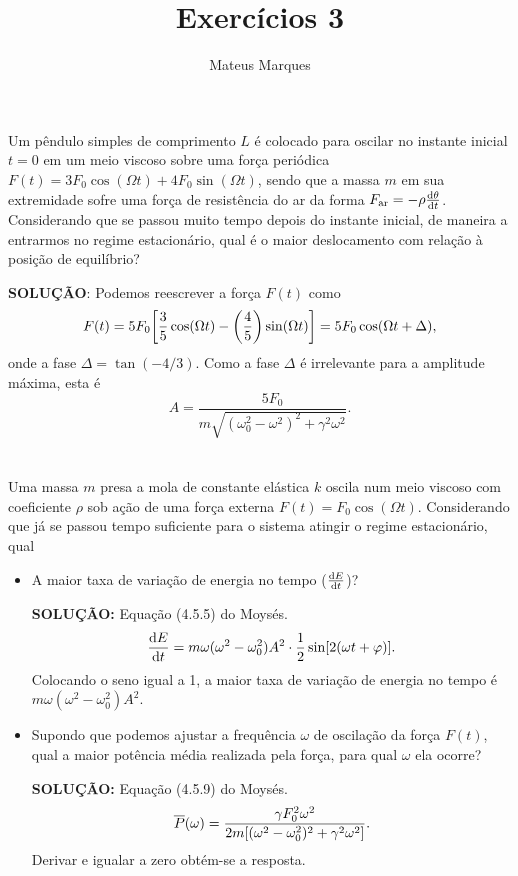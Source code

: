 \documentclass[a4paper,10pt]{article}
\title{\Huge{\textbf{Exercícios 3}}}
\author{Mateus Marques}
\begin{document}
\maketitle

\section{}

Um pêndulo simples de comprimento $L$ é colocado para oscilar no instante inicial $t = 0$ em um meio viscoso sobre uma força periódica $F(t) = 3 F_0 \cos(\Omega t) + 4 F_0 \sin(\Omega t)$, sendo que a massa $m$ em sua extremidade sofre uma força de resistência do ar da forma $F_{\text{ar}} = - \rho \dv{\theta}{t}$. Considerando que se passou muito tempo depois do instante inicial, de maneira a entrarmos no regime estacionário, qual é o maior deslocamento com relação à posição de equilíbrio?

\n

\textbf{SOLUÇÃO}: Podemos reescrever a força $F(t)$ como
$$
F(t) = 5 F_0 \qty[\frac{3}{5} \cos(\Omega t) - \qty(\frac{4}{5}) \sin(\Omega t)] = 5 F_0 \cos(\Omega t + \Delta),
$$
onde a fase $\Delta = \tan(-4/3)$. Como a fase $\Delta$ é irrelevante para a amplitude máxima, esta é
$$
A = \frac{5 F_0}{m \sqrt{(\omega_0^2 - \omega^2)^2 + \gamma^2 \omega^2}}.
$$


\n



\section{}


Uma massa $m$ presa a mola de constante elástica $k$ oscila num meio viscoso com coeficiente $\rho$ sob ação de uma força externa $F(t) = F_0 \cos(\Omega t)$. Considerando que já se passou tempo suficiente para o sistema atingir o regime estacionário, qual
\begin{itemize}
\item A maior taxa de variação de energia no tempo ($\dv{E}{t}$)?

\textbf{SOLUÇÃO:} Equação (4.5.5) do Moysés.
$$
\dv{E}{t} = m \omega (\omega^2 - \omega_0^2) A^2 \cdot \frac{1}{2} \sin[2(\omega t+\varphi)].
$$
Colocando o seno igual a 1, a maior taxa de variação de energia no tempo é $m\omega(\omega^2-\omega_0^2) A^2$.

\item Supondo que podemos ajustar a frequência $\omega$ de oscilação da força $F(t)$, qual a maior potência média realizada pela força, para qual $\omega$ ela ocorre?

\textbf{SOLUÇÃO:} Equação (4.5.9) do Moysés.
$$
\overline{P}(\omega) = \frac{\gamma F_0^2 \omega^2}{2m \qty[(\omega^2-\omega_0^2)^2 + \gamma^2\omega^2]}.
$$
Derivar e igualar a zero obtém-se a resposta.

\end{itemize}
\end{document}
